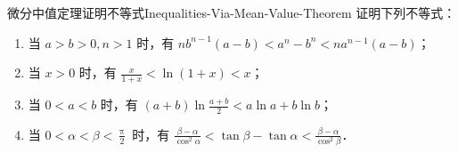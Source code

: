 \begin{problem}{微分中值定理证明不等式}{Inequalities-Via-Mean-Value-Theorem}
    证明下列不等式：
    \begin{enumerate}
        \item 当 $a > b > 0, n > 1$ 时，有 $n b^{n-1}(a-b) < a^n - b^n < n a^{n-1}(a-b)$；
        \item 当 $x > 0$ 时，有 $\frac{x}{1+x} < \ln(1+x) < x$；
        \item 当 $0 < a < b$ 时，有 $(a+b)\ln \frac{a+b}{2} < a\ln a + b\ln b$；
        \item 当 $0 < \alpha < \beta < \frac{\uppi}{2}$ 时，有 $\frac{\beta-\alpha}{\cos^2 \alpha} < \tan \beta - \tan \alpha < \frac{\beta-\alpha}{\cos^2 \beta}$．
    \end{enumerate}
\end{problem}

